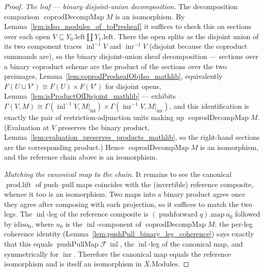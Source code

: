 \begin{proof}
  \emph{The leaf — binary disjoint-union decomposition.} The decomposition comparison
  \(\operatorname{coprodDecompMap} M\) is an isomorphism. By
  Lemma~\ref{lem:isIso_modules_of_toPresheaf} it suffices to check this on sections over each open
  \(V \subseteq Y_0.\mathrm{left} \amalg Y_1.\mathrm{left}\). There the open splits as the disjoint
  union of its two component traces \(\operatorname{inl}^{-1}V\) and \(\operatorname{inr}^{-1}V\)
  (disjoint because the coproduct summands are), so the binary disjoint-union sheaf decomposition ---
  sections over a binary coproduct scheme are the product of the sections over the two preimages,
  Lemma~\ref{lem:coprodPresheafObjIso_mathlib}, equivalently \(F(U \sqcup V') \cong F(U) \times
  F(V')\) for disjoint opens, Lemma~\ref{lem:isProductOfDisjoint_mathlib} --- exhibits \(\Gamma(V, M)
  \cong \Gamma(\operatorname{inl}^{-1}V, M|_{\operatorname{inl}}) \times
  \Gamma(\operatorname{inr}^{-1}V, M|_{\operatorname{inr}})\), and this identification is exactly the
  pair of restriction-adjunction units making up \(\operatorname{coprodDecompMap} M\). (Evaluation at
  \(V\) preserves the binary product, Lemma~\ref{lem:evaluation_preserves_products_mathlib}, so the
  right-hand sections are the corresponding product.) Hence \(\operatorname{coprodDecompMap} M\) is an
  isomorphism, and the reference chain above is an isomorphism.

  \emph{Matching the canonical map to the chain.} It remains to see the canonical
  \(\operatorname{prod.lift}\) of push--pull maps coincides with the (invertible) reference composite,
  whence it too is an isomorphism. Two maps into a binary product agree once they agree after
  composing with each projection, so it suffices to match the two legs. The
  \(\operatorname{inl}\)-leg of the reference composite is \((\operatorname{pushforward} q).\mathrm{map}
  \,u_0\) followed by \(\mathrm{idiso}_0\), where \(u_0\) is the \(\operatorname{inl}\)-component of
  \(\operatorname{coprodDecompMap} M\); the per-leg coherence identity
  (Lemma~\ref{lem:pushPull_binary_leg_coherence}) says exactly that this equals
  \(\operatorname{pushPullMap}\mathcal{F}\,\overline{\operatorname{inl}}\), the \(\operatorname{inl}\)-leg
  of the canonical map, and symmetrically for \(\operatorname{inr}\). Therefore the canonical map
  equals the reference isomorphism and is itself an isomorphism in \(X.\mathrm{Modules}\).
\end{proof}


